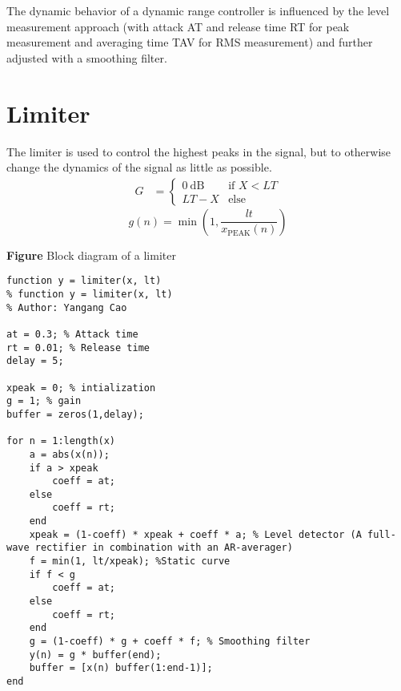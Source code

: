 \documentclass[10pt,a4paper,oneside]{article}
\newcommand{\product}{$\displaystyle \times$}
\begin{document}
The dynamic behavior of a dynamic range controller is influenced by the level measurement approach (with attack AT and release time RT for peak measurement and averaging time TAV for RMS measurement) and further adjusted with a smoothing filter.
\section{Limiter}
The limiter is used to control the highest peaks in the signal, but to otherwise change the dynamics of the signal as little as possible.
\begin{align*}
G &=
\begin{cases} 
0 \ \mbox{dB}  &\mbox{if }X < LT\\
LT-X &\mbox{else}
\end{cases}
\end{align*}
\[
g ( n ) = \min \left( 1 , \frac { l t } { x _ { \mathrm { PEAK } } ( n ) } \right)
\]
\begin{center}
\textbf {Figure} Block diagram of a limiter
\end{center}

\begin{lstlisting}
function y = limiter(x, lt)
% function y = limiter(x, lt)
% Author: Yangang Cao

at = 0.3; % Attack time
rt = 0.01; % Release time
delay = 5;

xpeak = 0; % intialization
g = 1; % gain
buffer = zeros(1,delay);

for n = 1:length(x)
	a = abs(x(n));
	if a > xpeak
		coeff = at;
	else
		coeff = rt;
	end
	xpeak = (1-coeff) * xpeak + coeff * a; % Level detector (A full-wave rectifier in combination with an AR-averager)
	f = min(1, lt/xpeak); %Static curve
	if f < g
		coeff = at;
	else
		coeff = rt;
	end
	g = (1-coeff) * g + coeff * f; % Smoothing filter
	y(n) = g * buffer(end);
	buffer = [x(n) buffer(1:end-1)];
end
\end{lstlisting}
\end{document}
